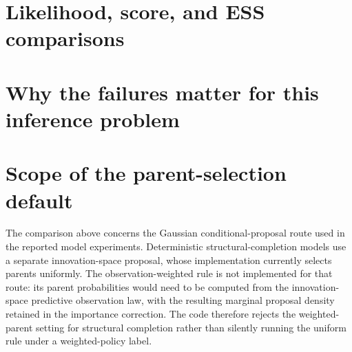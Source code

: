 \section{Likelihood, score, and ESS comparisons}


\section{Why the failures matter for this inference problem}


\section{Scope of the parent-selection default}
The comparison above concerns the Gaussian conditional-proposal route used in
the reported model experiments. Deterministic structural-completion models
use a separate innovation-space proposal, whose implementation currently
selects parents uniformly. The observation-weighted rule is not implemented
for that route: its parent probabilities would need to be computed from the
innovation-space predictive observation law, with the resulting marginal
proposal density retained in the importance correction. The code therefore
rejects the weighted-parent setting for structural completion rather than
silently running the uniform rule under a weighted-policy label.
